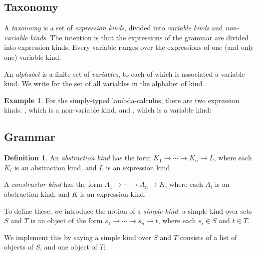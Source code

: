\documentclass{article}
\theoremstyle{definition}
\newtheorem{example}[lm]{Example}
\newtheorem{df}[lm]{Definition}
\begin{document}
\subsection{Taxonomy}

A \emph{taxonomy} is a set of \emph{expression kinds}, divided into \emph{variable kinds} and \emph{non-variable kinds}.
The intention is that the expressions of the grammar are divided into expression kinds.  Every
variable ranges over the expressions of one (and only one) variable kind.


An \emph{alphabet} is a finite set of \emph{variables}, to each of which is associated a variable kind.  We write   
for the set of all variables in the alphabet  of kind .


\begin{example}
For the simply-typed lambda-calculus, there are two expression kinds: ,
which is a non-variable kind, and , which is a variable kind:

\end{example}

\subsection{Grammar}

\begin{df}
\label{df:kinds}
An \emph{abstraction kind} has the form $K_1 \rightarrow \cdots \rightarrow K_n \rightarrow L$,
where each $K_i$ is an abstraction kind, and $L$ is an expression kind.

A \emph{constructor kind} has the form $A_1 \rightarrow \cdots \rightarrow A_n \rightarrow K$,
where each $A_i$ is an abstraction kind, and $K$ is an expression kind.
\end{df}

To define these, we introduce the notion of a \emph{simple kind}:
a simple kind over sets $S$ and $T$ is an object of the form $s_1 \rightarrow \cdots \rightarrow s_n \rightarrow t$,
where each $s_i \in S$ and $t \in T$.

We implement this by saying a simple kind over $S$ and $T$ consists of a list of objects of $S$, and one object of $T$:
\end{document}
